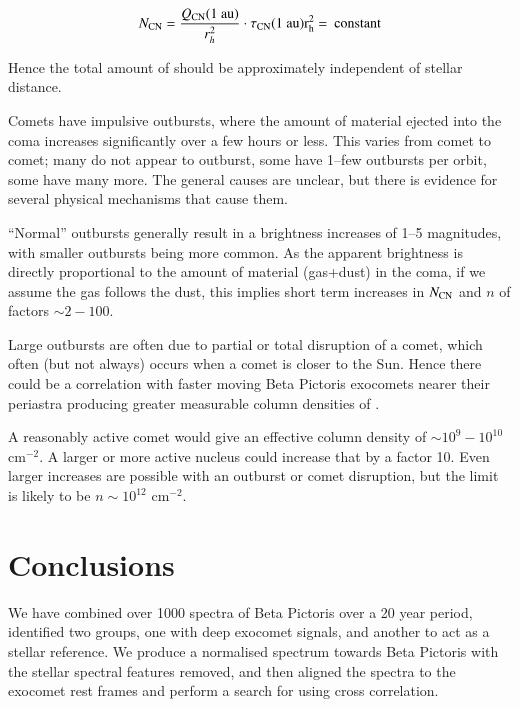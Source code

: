 \documentclass{aa}
\newcommand{\bp}{Beta Pictoris}
\begin{document}
$$N_{\ce{CN}}=\frac{Q_{\ce{CN}}(1~\rm{au})}{r_h^2}\cdot  \tau_{\ce{CN}} (1~\rm{au}) r_h^2 =\:{\rm constant} $$

Hence the total amount of  should be approximately independent of stellar distance.

Comets have impulsive outbursts, where the amount of material ejected into the coma increases significantly over a few hours or less.
%
This varies from comet to comet; many do not appear to outburst, some have 1--few outbursts per orbit, some have many more.
%
The general causes are unclear, but there is evidence for several physical mechanisms that cause them. 

``Normal'' outbursts generally result in a brightness increases of 1--5 magnitudes, with smaller outbursts being more common.
%
As the apparent brightness is directly proportional to the amount of material (gas+dust) in the coma, if we assume the gas follows the dust, this implies short term increases in $N_{\ce{CN}}$ and $n$ of factors $\sim 2-100$.

Large outbursts are often due to partial or total disruption of a comet, which often (but not always) occurs when a comet is closer to the Sun.
%
Hence there could be a correlation with faster moving \bp{} exocomets nearer their periastra producing greater measurable column densities of .

A reasonably active comet would give an effective  column density of $\sim 10^{9}-10^{10}$ cm$^{-2}$.
%
A larger or more active nucleus could increase that by a factor 10.
%
Even larger increases are possible with an outburst or comet disruption, but the limit is likely to be  $n\sim10^{12}$ cm$^{-2}$.


\section{Conclusions}\label{sec:conclusion}

We have combined over 1000 spectra of Beta Pictoris over a 20 year period, identified two groups, one with deep exocomet signals, and another to act as a stellar reference.
%
We produce a normalised spectrum towards Beta Pictoris with the stellar spectral features removed, and then aligned the spectra to the exocomet rest frames and perform a search for  using cross correlation.
\end{document}
